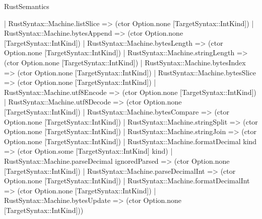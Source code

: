 \begin{lexlean}{RustSemantics}
\begin{semanticmodule}
{    | RustSyntax::Machine.listSlice => (ctor Option.none [TargetSyntax::IntKind])
    | RustSyntax::Machine.bytesAppend => (ctor Option.none [TargetSyntax::IntKind])
    | RustSyntax::Machine.bytesLength => (ctor Option.none [TargetSyntax::IntKind])
    | RustSyntax::Machine.stringLength => (ctor Option.none [TargetSyntax::IntKind])
    | RustSyntax::Machine.bytesIndex => (ctor Option.none [TargetSyntax::IntKind])
    | RustSyntax::Machine.bytesSlice => (ctor Option.none [TargetSyntax::IntKind])
    | RustSyntax::Machine.utf8Encode => (ctor Option.none [TargetSyntax::IntKind])
    | RustSyntax::Machine.utf8Decode => (ctor Option.none [TargetSyntax::IntKind])
    | RustSyntax::Machine.bytesCompare => (ctor Option.none [TargetSyntax::IntKind])
    | RustSyntax::Machine.stringSplit => (ctor Option.none [TargetSyntax::IntKind])
    | RustSyntax::Machine.stringJoin => (ctor Option.none [TargetSyntax::IntKind])
    | RustSyntax::Machine.formatDecimal kind => (ctor Option.some [TargetSyntax::IntKind] kind)
    | RustSyntax::Machine.parseDecimal ignoredParsed => (ctor Option.none [TargetSyntax::IntKind])
    | RustSyntax::Machine.parseDecimalInt => (ctor Option.none [TargetSyntax::IntKind])
    | RustSyntax::Machine.formatDecimalInt => (ctor Option.none [TargetSyntax::IntKind])
    | RustSyntax::Machine.bytesUpdate => (ctor Option.none [TargetSyntax::IntKind]))
}


\end{semanticmodule}
\end{lexlean}
